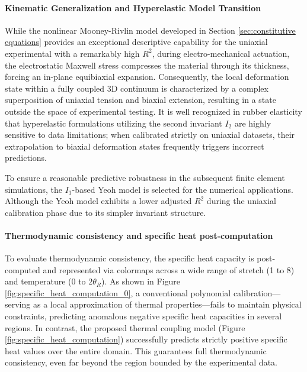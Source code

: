 \paragraph{Kinematic Generalization and Hyperelastic Model Transition}
\label{sec:model_transition}
While the nonlinear Mooney-Rivlin model developed in Section \ref{sec:constitutive equations} provides an exceptional descriptive capability for the uniaxial experimental with a remarkably high $R^2$, 
during electro-mechanical actuation, the electrostatic Maxwell stress compresses the material through its thickness, forcing an in-plane equibiaxial expansion. Consequently, the local deformation state within a fully coupled 3D continuum is characterized by a complex superposition of uniaxial tension and biaxial extension, resulting in a state outside the space of experimental testing. It is well recognized in rubber elasticity that hyperelastic formulations utilizing the second invariant $I_2$ are highly sensitive to data limitations; when calibrated strictly on uniaxial datasets, their extrapolation to biaxial deformation states frequently triggers incorrect predictions. 

To ensure a reasonable predictive robustness in the subsequent finite element simulations, the $I_1$-based Yeoh model is selected for the numerical applications. Although the Yeoh model exhibits a lower adjusted $R^2$ during the uniaxial calibration phase due to its simpler invariant structure.


\paragraph{Thermodynamic consistency and specific heat post-computation}
To evaluate thermodynamic consistency, the specific heat capacity is post-computed and represented via colormaps across a wide range of stretch (1 to 8) and temperature (0 to $2\theta_R$). As shown in Figure \ref{fig:specific_heat_computation_0}, a conventional polynomial calibration—serving as a local approximation of thermal properties—fails to maintain physical constraints, predicting anomalous negative specific heat capacities in several regions. In contrast, the proposed thermal coupling model (Figure \ref{fig:specific_heat_computation}) successfully predicts strictly positive specific heat values over the entire domain. This guarantees full thermodynamic consistency, even far beyond the region bounded by the experimental data.

